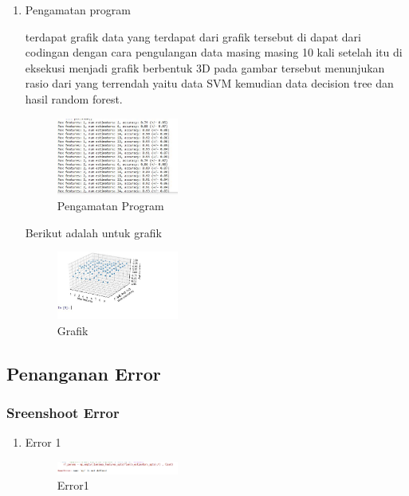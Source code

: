 \begin{enumerate}
        \item Pengamatan program \hfill \break 
        
        terdapat grafik data yang terdapat dari grafik tersebut di dapat dari codingan dengan cara pengulangan data masing masing 10 kali setelah itu di eksekusi menjadi grafik berbentuk 3D pada gambar tersebut menunjukan rasio dari yang terrendah yaitu data SVM kemudian data decision tree dan hasil random forest.
        \begin{figure}[H]
            \includegraphics[width=4cm]{figures/1174003/4/8.jpg}
            \centering
            \caption{Pengamatan Program}
        \end{figure}

        Berikut adalah untuk grafik \hfill \break 
        \begin{figure}[H]
            \includegraphics[width=4cm]{figures/1174003/4/9.jpg}
            \centering
            \caption{Grafik}
        \end{figure}
    \end{enumerate}
    \subsection{Penanganan Error}
        \subsubsection{Sreenshoot Error}
        \begin{enumerate}
            \item Error 1
            \begin{figure}[H]
                \includegraphics[width=4cm]{figures/1174003/4/errtype1.png}
                \centering
                \caption{Error1}
            \end{figure}
        \end{enumerate}

